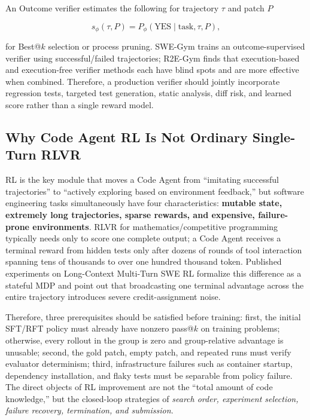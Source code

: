 \documentclass[10pt,a4paper,UTF8,fontset=none]{ctexart}
\begin{document}
An Outcome verifier estimates the following for trajectory $\tau$ and patch $P$

\begin{equation}
s_{\phi}(\tau,P)=P_{\phi}(\mathrm{YES}\mid \text{task},\tau,P),
\label{en:eq:verifier}
\end{equation}

for Best@$k$ selection or process pruning. SWE-Gym trains an outcome-supervised verifier using successful/failed trajectories\cite{en:pan2024swegym}; R2E-Gym finds that execution-based and execution-free verifier methods each have blind spots and are more effective when combined\cite{en:jain2025r2egym}. Therefore, a production verifier should jointly incorporate regression tests, targeted test generation, static analysis, diff risk, and learned score rather than a single reward model.

\subsection{Why Code Agent RL Is Not Ordinary Single-Turn RLVR}

RL is the key module that moves a Code Agent from ``imitating successful trajectories'' to ``actively exploring based on environment feedback,'' but software engineering tasks simultaneously have four characteristics: \textbf{mutable state, extremely long trajectories, sparse rewards, and expensive, failure-prone environments}. RLVR for mathematics/competitive programming typically needs only to score one complete output; a Code Agent receives a terminal reward from hidden tests only after dozens of rounds of tool interaction spanning tens of thousands to over one hundred thousand token. Published experiments on Long-Context Multi-Turn SWE RL formalize this difference as a stateful MDP and point out that broadcasting one terminal advantage across the entire trajectory introduces severe credit-assignment noise\cite{en:golubev2025longcontextrl}.

Therefore, three prerequisites should be satisfied before training: first, the initial SFT/RFT policy must already have nonzero pass@$k$ on training problems; otherwise, every rollout in the group is zero and group-relative advantage is unusable; second, the gold patch, empty patch, and repeated runs must verify evaluator determinism; third, infrastructure failures such as container startup, dependency installation, and flaky tests must be separable from policy failure. The direct objects of RL improvement are not the ``total amount of code knowledge,'' but the closed-loop strategies of \emph{search order, experiment selection, failure recovery, termination, and submission}.
\end{document}
